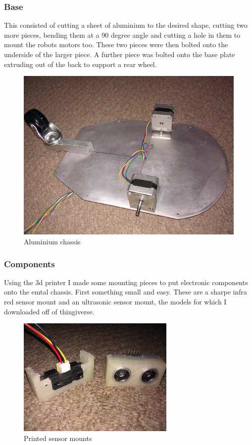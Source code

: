 \documentclass[11pt,fleqn,twoside]{article}
\begin{document}
\subsubsection{Base}
This consisted of cutting a sheet of aluminium to the desired shape, cutting two more pieces, bending them at a 90 degree angle and cutting a hole in them to mount the robots motors too.  These two pieces were then bolted onto the underside of the larger piece.  A further piece was bolted onto the base plate extruding out of the back to support a rear wheel.
\begin{figure}[h]
\centering
        \includegraphics[width=5.0in] {figures/aluminium-chassis.jpg}
        \caption{Aluminium chassis}
        \label{Aluminium chassis}
\end{figure}

\subsubsection{Components}
Using the 3d printer I made some mounting pieces to put electronic components onto the emtal chassis.  First something small and easy.  These are a sharpe infra red sensor mount and an ultrasonic sensor mount, the models for which I downloaded off of thingiverse.
\begin{figure}[h]
\centering
        \includegraphics[width=3.0in] {figures/printed-sensor-mounts.jpg}
        \caption{Printed sensor mounts}
        \label{Printed sensor mounts}
\end{figure}
\end{document}
